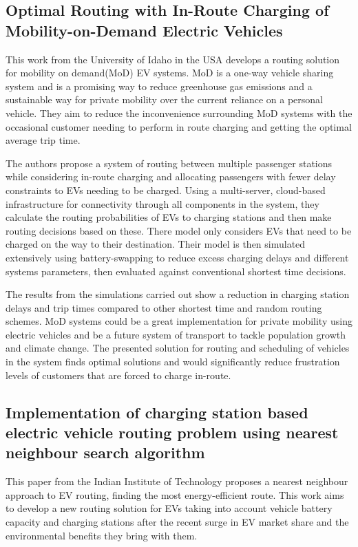 \documentclass[11pt]{report}
\begin{document}
\subsection{Optimal Routing with In-Route Charging of Mobility-on-Demand Electric Vehicles  \autocite{inRouteOptimalAmmous}}

This work from the University of Idaho in the USA develops a routing solution for mobility on demand(MoD) EV systems. MoD is a one-way vehicle sharing system and is a promising way to reduce greenhouse gas emissions and a sustainable way for private mobility over the current reliance on a personal vehicle. They aim to reduce the inconvenience surrounding MoD systems with the occasional customer needing to perform in route charging and getting the optimal average trip time.

The authors propose a system of routing between multiple passenger stations while considering in-route charging and allocating passengers with fewer delay constraints to EVs needing to be charged. Using a multi-server, cloud-based infrastructure for connectivity through all components in the system, they calculate the routing probabilities of EVs to charging stations and then make routing decisions based on these. There model only considers EVs that need to be charged on the way to their destination. Their model is then simulated extensively using battery-swapping to reduce excess charging delays and different systems parameters, then evaluated against conventional shortest time decisions.

The results from the simulations carried out show a reduction in charging station delays and trip times compared to other shortest time and random routing schemes. MoD systems could be a great implementation for private mobility using electric vehicles and be a future system of transport to tackle population growth and climate change. The presented solution for routing and scheduling of vehicles in the system finds optimal solutions and would significantly reduce frustration levels of customers that are forced to charge in-route.

\subsection{Implementation of charging station based electric vehicle routing problem using nearest neighbour search algorithm  \autocite{csNearestNeighbourDaanish}}

This paper from the Indian Institute of Technology proposes a nearest neighbour approach to EV routing, finding the most energy-efficient route. This work aims to develop a new routing solution for EVs taking into account vehicle battery capacity and charging stations after the recent surge in EV market share and the environmental benefits they bring with them.
\end{document}
